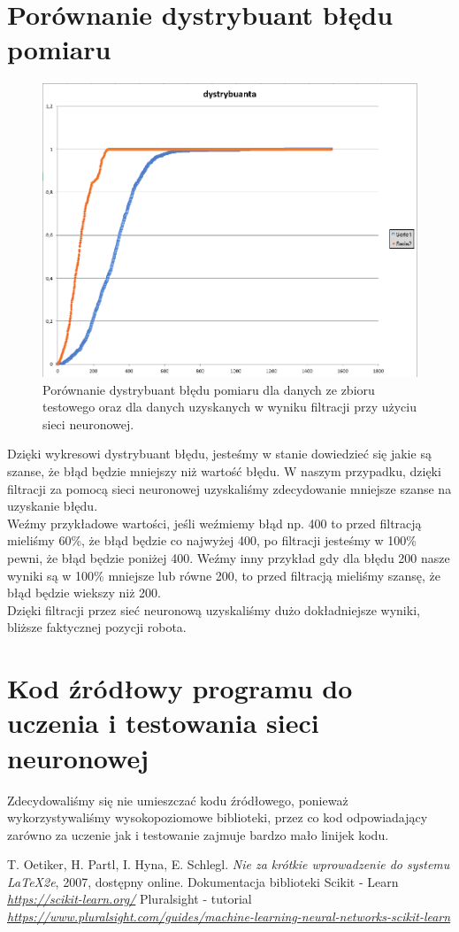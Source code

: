 \documentclass{classrep}
\begin{document}
\section{Porównanie dystrybuant błędu pomiaru}
{
	\begin{figure}[htp]
	\centering
	\includegraphics[width=15cm]{Wykres.png}
	\caption{Porównanie dystrybuant błędu pomiaru dla danych ze zbioru testowego oraz dla danych uzyskanych w wyniku filtracji przy użyciu sieci neuronowej. }
	\label{fig:lion}
	\end{figure}
	Dzięki wykresowi dystrybuant błędu, jesteśmy w stanie dowiedzieć się jakie są szanse, że błąd będzie mniejszy niż wartość błędu. W naszym przypadku, dzięki filtracji za pomocą sieci neuronowej uzyskaliśmy zdecydowanie mniejsze szanse na uzyskanie błędu. \\ 
	Weźmy przykładowe wartości, jeśli weźmiemy błąd np. 400 to przed filtracją mieliśmy 60\%, że błąd będzie co najwyżej 400, po filtracji jesteśmy w 100\% pewni, że błąd będzie poniżej 400. Weźmy inny przykład gdy dla błędu 200 nasze wyniki są w 100\% mniejsze lub równe 200, to przed filtracją mieliśmy szansę, że błąd będzie wiekszy niż 200.\\
	Dzięki filtracji przez sieć neuronową uzyskaliśmy dużo dokładniejsze wyniki, bliższe faktycznej pozycji robota.
}

\section{Kod źródłowy programu do uczenia i testowania sieci neuronowej}
{
	Zdecydowaliśmy się nie umieszczać kodu źródłowego, ponieważ wykorzystywaliśmy wysokopoziomowe biblioteki, przez co kod odpowiadający zarówno za uczenie jak i testowanie zajmuje 	bardzo mało linijek kodu.
}

\begin{thebibliography}{0}
   T. Oetiker, H. Partl, I. Hyna, E. Schlegl.
    \textsl{Nie za krótkie wprowadzenie do systemu \LaTeX2e}, 2007, dostępny
    online.
 Dokumentacja biblioteki Scikit - Learn
	\textsl{\url{https://scikit-learn.org/}}
 Pluralsight - tutorial
	\textsl{ \url{https://www.pluralsight.com/guides/machine-learning-neural-networks-scikit-learn}}
\end{thebibliography}
\end{document}
